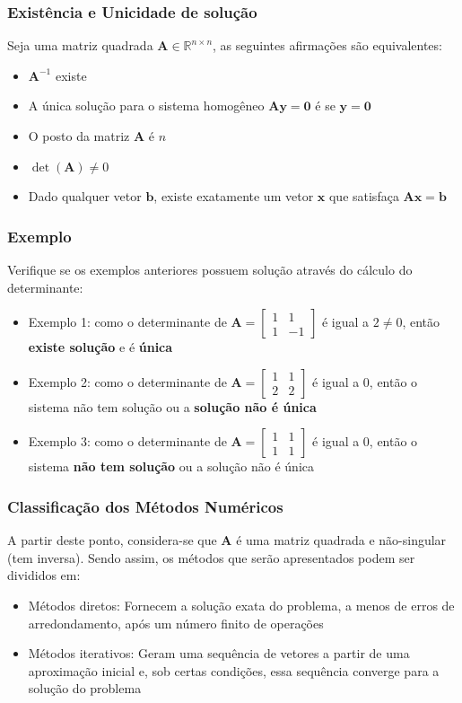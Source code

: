 \documentclass{beamer}
\theoremstyle{mystyle}
\begin{document}
\begin{frame}
	\frametitle{Existência e Unicidade de solução}
	Seja uma matriz quadrada $ \mathbf{A} \in \mathbb{R}^{n\times n} $, as seguintes afirmações são equivalentes:
	\begin{itemize}
		\item $ \mathbf{A}^{-1} $ existe
		\item A única solução para o sistema homogêneo $ \mathbf{Ay} = \mathbf{0}$ é se $ \mathbf{y} = \mathbf{0} $
		\item O posto da matriz $ \mathbf{A} $ é $ n $
		\item $\det (\mathbf{A}) \neq 0$
		\item Dado qualquer vetor $ \mathbf{b} $, existe exatamente um vetor $ \mathbf{x} $ que satisfaça $ \mathbf{Ax} = \mathbf{b}$
	\end{itemize}
\end{frame}

\begin{frame}
	\frametitle{Exemplo}
	Verifique se os exemplos anteriores possuem solução através do cálculo do determinante:
	\pause
	\begin{itemize}
		\item Exemplo 1: como o determinante de $ \mathbf{A} = \left[
		\begin{array}{cc}
			1 & 1 \\
			1 & -1 
		\end{array}
		\right] $ é igual a $ 2 \neq 0 $, então \textbf{existe solução} e é \textbf{única}
		\item Exemplo 2: como o determinante de $ \mathbf{A} = \left[
		\begin{array}{cc}
			1 & 1 \\
			2 & 2 
		\end{array}
		\right] $ é igual a 0, então o sistema não tem solução ou a \textbf{solução não é única}
		\item Exemplo 3: como o determinante de $ \mathbf{A} = \left[
		\begin{array}{cc}
			1 & 1 \\
			1 & 1 
		\end{array}
		\right] $ é igual a 0, então o sistema \textbf{não tem solução} ou a solução não é única
	\end{itemize}
\end{frame}

\begin{frame}
	\frametitle{Classificação dos Métodos Numéricos}
	A partir deste ponto, considera-se que \textbf{A} é uma matriz quadrada e não-singular (tem inversa). Sendo assim, os métodos que serão apresentados podem ser divididos em:
	\begin{itemize}
		\item Métodos diretos: Fornecem a solução exata do problema, a menos de erros de arredondamento, após um número finito de operações
		\item Métodos iterativos: Geram uma sequência de vetores a partir de uma aproximação inicial e, sob certas condições, essa sequência converge para a solução do problema	 
	\end{itemize}
\end{frame}
\end{document}
